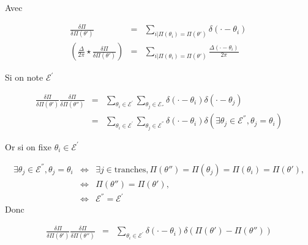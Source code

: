 	Avec 
	
	\begin{eqnarray}
			\frac{\delta \Pi }{\delta \Pi(\theta') } & = & \sum_{i\vert \Pi(\theta_i) = \Pi(\theta')}  \delta ( \cdot  - \theta_i ) \,  \\
			\left  ( \frac{\Delta}{2\pi} \star \frac{\delta \Pi}{\delta \Pi(\theta') }  \right ) & = & 	\sum_{i \vert \Pi(\theta_i) = \Pi(\theta')}\frac{\Delta ( \cdot - \theta_i )}{2\pi}
	\end{eqnarray}
	
	Si on note $\mathscr{E}^{'}$
	
	\begin{eqnarray}
		\frac{\delta \Pi }{\delta \Pi(\theta') } \frac{\delta \Pi }{\delta \Pi(\theta'') } & = & \sum_{\theta_i \in  \mathscr{E}^{'}} \sum_{\theta_j \in  \mathscr{E}_{''}}   \delta ( \cdot  - \theta_i )	\delta ( \cdot  - \theta_j )	\\
		& = & 	\sum_{\theta_i \in  \mathscr{E}^{'}} \sum_{\theta_j \in  \mathscr{E}^{''}}   \delta ( \cdot  - \theta_i )	\delta ( \exists \theta_j \in \mathscr{E}^{''} , \theta_j = \theta_i )
	\end{eqnarray}
	
	Or si on fixe $  \theta_i \in \mathscr{E}^{'} $
	
	\begin{eqnarray}
		 \exists \theta_j \in \mathscr{E}^{''} , \theta_j = \theta_i & \Leftrightarrow & \exists j \in \mbox{tranches} , \Pi(\theta'') = \Pi(\theta_j ) =  \Pi(\theta_i  ) = \Pi(\theta' ),\\
		 & \Leftrightarrow & \Pi(\theta'') =
		\Pi(\theta' ),\\
		& \Leftrightarrow & \mathscr{E}^{''} = \mathscr{E}^{'}
	\end{eqnarray}
	Donc 
	
	\begin{eqnarray}
		\frac{\delta \Pi }{\delta \Pi(\theta') } \frac{\delta \Pi }{\delta \Pi(\theta'') } & = & \sum_{\theta_i \in  \mathscr{E}^{'}}   \delta ( \cdot  - \theta_i )	\delta (  \Pi(\theta')  - \Pi(\theta'') )
	\end{eqnarray}
	
	
	
